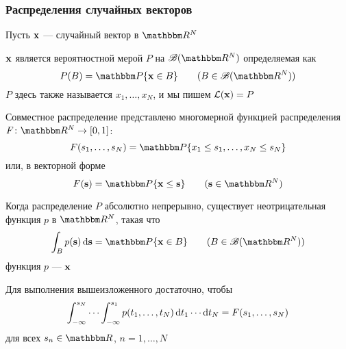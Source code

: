 \begin{frame}\frametitle{Распределения случайных векторов}
    
    \vspace{2em}
    Пусть ${\mathbf x}$ --- случайный вектор в $\RR^N$
    
    \vspace{1em}
     ${\mathbf x}$ является вероятностной мерой $P$ на $\bB(\RR^N)$ 
    определяемая как
    \begin{equation*}
        \label{eq:dmnu}
        P(B) = \PP\{\boldx \in B\}
        \qquad (B \in \bB(\RR^N))
    \end{equation*}
    $P$ здесь также называется 
    $x_1,\ldots, x_N$, и мы пишем $\mathcal L({\mathbf x}) = P$
    
\end{frame}
    
\begin{frame}
    
    \vspace{2em}
    Совместное распределение представлено многомерной функцией распределения 
    $F \colon \RR^N \to [0, 1]$:
    $$F(s_1,\ldots,s_N) = \PP\{ x_1 \leq s_1, \ldots, x_N \leq s_N\}$$
    или, в векторной форме
    \begin{equation*}
        F(\bolds) = \PP\{\boldx \leq \bolds\}
        \qquad (\bolds \in \RR^N)
    \end{equation*}
    
\end{frame}

\begin{frame}

    \vspace{2em}
    Когда распределение $P$
    абсолютно непрерывно, существует неотрицательная функция $p$ в $\RR^N$, такая что
    \begin{equation*}
        \label{eq:defjd00}
        \int_B p(\bolds) \diff  \bolds = \PP\{\boldx \in B\}
        \qquad (B \in \bB(\RR^N))
    \end{equation*}
    функция $p$ ---  ${\mathbf x}$
    
    \vspace{1em}
    Для выполнения вышеизложенного достаточно, чтобы 
    \begin{equation*}
    \label{eq:defjd}
    \int_{-\infty}^{s_N} 
    \cdots
     \int_{-\infty}^{s_1} 
    p(t_1,\ldots,t_N) 
    \mathop{}\!\mathrm{d} t_1 \cdots \mathop{}\!\mathrm{d} t_N
    = F(s_1,\ldots,s_N) 
    \end{equation*}
    для всех $s_n  \in \RR$, $n=1,\ldots, N$ 
    
\end{frame}


